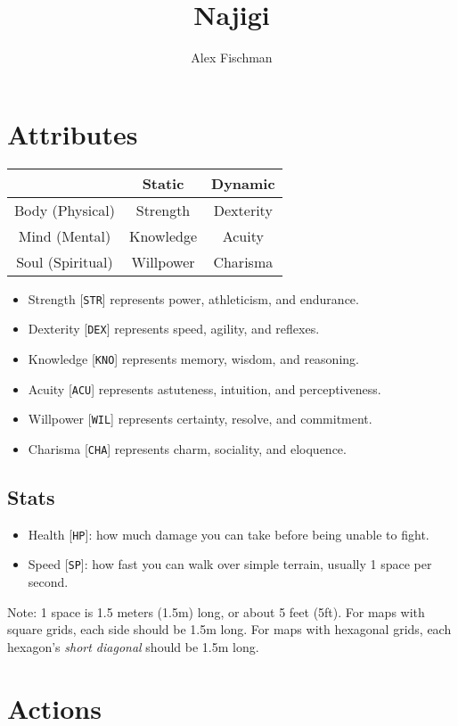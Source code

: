 \documentclass[12pt]{article}
\title{Najigi}
\author{Alex Fischman}
\newcommand{\STR}{\texttt{STR}}
\newcommand{\DEX}{\texttt{DEX}}
\newcommand{\KNO}{\texttt{KNO}}
\newcommand{\ACU}{\texttt{ACU}}
\newcommand{\WIL}{\texttt{WIL}}
\newcommand{\CHA}{\texttt{CHA}}
\newcommand{\HP}{\texttt{HP}}
\newcommand{\SP}{\texttt{SP}}
\begin{document}
\maketitle
\tableofcontents
\clearpage

\pagebreak
\section{Attributes}

\begin{tabularx}{\textwidth}{C|C C}
& Static & Dynamic \\\hline
Body (Physical) & Strength & Dexterity \\
Mind (Mental) & Knowledge & Acuity \\
Soul (Spiritual) & Willpower & Charisma
\end{tabularx}

\begin{itemize}
\item Strength [\STR] represents power, athleticism, and endurance.
\item Dexterity [\DEX] represents speed, agility, and reflexes.
\item Knowledge [\KNO] represents memory, wisdom, and reasoning.
\item Acuity [\ACU] represents astuteness, intuition, and perceptiveness.
\item Willpower [\WIL] represents certainty, resolve, and commitment.
\item Charisma [\CHA] represents charm, sociality, and eloquence.
\end{itemize}

\subsection{Stats}

\begin{itemize}
\item Health [\HP]: how much damage you can take before being unable to fight.
\item Speed [\SP]: how fast you can walk over simple terrain, usually 1 space per second.
\end{itemize}

Note: 1 space is 1.5 meters (1.5m) long, or about 5 feet (5ft). For maps with square grids, each side should be 1.5m long. For maps with hexagonal grids, each hexagon’s \textit{short diagonal} should be 1.5m long.

\pagebreak
\section{Actions}
\end{document}
